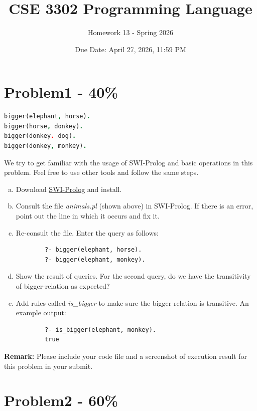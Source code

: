 \documentclass{article}
\begin{document}
\title{CSE 3302 Programming Language}
\author{Homework 13 - Spring 2026}
\date{Due Date: April 27, 2026, 11:59 PM}
\maketitle
\thispagestyle{fancy}


\section*{Problem1 - 40\%}

\begin{lstlisting}[language=Prolog]
bigger(elephant, horse).
bigger(horse, donkey).
bigger(donkey. dog).
bigger(donkey, monkey).
\end{lstlisting}
	
We try to get familiar with the usage of SWI-Prolog and basic operations in this problem. Feel free to use other tools and follow the same steps.
\begin{enumerate}[(a)]
    \item Download \href{http://www.swi-prolog.org/}{SWI-Prolog} and install.
    \item Consult the file \textit{animals.pl} (shown above) in SWI-Prolog. If there is an error, point out the line in which it occurs and fix it. 
    \item Re-consult the file. Enter the query as follows:
    
    \begin{verbatim}
        ?- bigger(elephant, horse).
        ?- bigger(elephant, monkey).
    \end{verbatim}
    \item Show the result of queries. For the second query, do we have the transitivity of bigger-relation as expected?
    \item Add rules called \textit{is\_bigger} to make sure the bigger-relation is transitive. An example output:
    \begin{verbatim}
        ?- is_bigger(elephant, monkey).
        true
    \end{verbatim}
\end{enumerate}
\textbf{Remark:} 
Please include your code file and a screenshot of execution result for this problem in your submit.

\newpage

\section*{Problem2 - 60\%}
\end{document}
